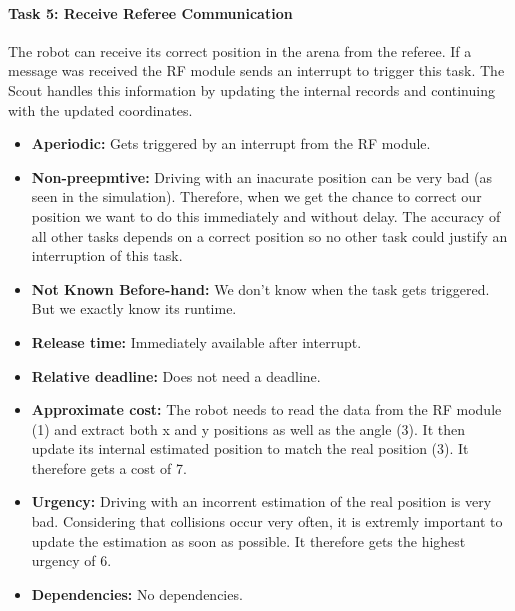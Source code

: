 \documentclass[12pt]{article}
\begin{document}
\paragraph{Task 5: Receive Referee Communication} 
The robot can receive its correct position in the arena from the referee. If a message was received the RF module sends an interrupt to trigger this task. The Scout handles this information by updating the internal records and continuing with the updated coordinates.
    \begin{itemize}
	\item \textbf{Aperiodic:} Gets triggered by an interrupt from the RF module.
	\item \textbf{Non-preepmtive:} Driving with an inacurate position can be very bad (as seen in the simulation). Therefore, when we get the chance to correct our position we want to do this immediately and without delay. The accuracy of all other tasks depends on a correct position so no other task could justify an interruption of this task.
  	\item \textbf{Not Known Before-hand:} We don't know when the task gets triggered. But we exactly know its runtime.
  	\item \textbf{Release time:} Immediately available after interrupt.
  	\item \textbf{Relative deadline:} Does not need a deadline.
  	\item \textbf{Approximate cost:} The robot needs to read the data from the RF module (1) and extract both x and y positions as well as the angle (3). It then update its internal estimated position to match the real position (3). It therefore gets a cost of 7.
  	\item \textbf{Urgency:} Driving with an incorrent estimation of the real position is very bad. Considering that collisions occur very often, it is extremly important to update the estimation as soon as possible. It therefore gets the highest urgency of 6.
  	\item \textbf{Dependencies:} No dependencies.
   	\end{itemize}
\end{document}
